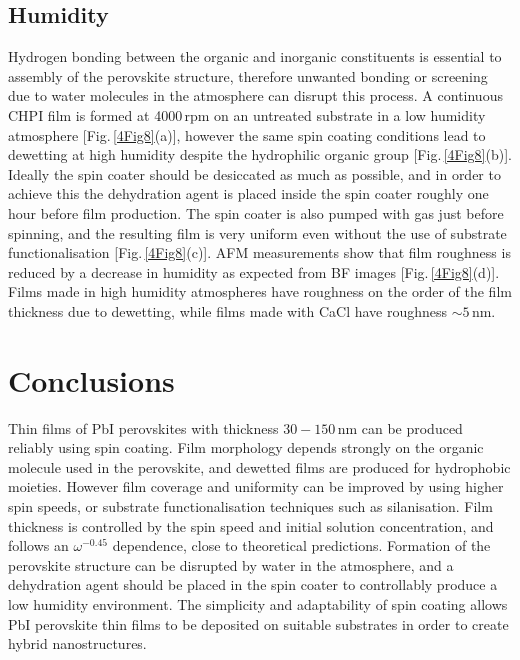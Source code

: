 \subsection{Humidity}
Hydrogen bonding between the organic and inorganic constituents is essential to assembly of the perovskite structure, therefore unwanted bonding or screening due to water molecules in the atmosphere can disrupt this process. A continuous CHPI film is formed at 4000\,rpm on an untreated substrate in a low humidity atmosphere [Fig.\,\ref{4Fig8}(a)], however the same spin coating conditions lead to dewetting at high humidity despite the hydrophilic organic group [Fig.\,\ref{4Fig8}(b)]. Ideally the spin coater should be desiccated as much as possible, and in order to achieve this the dehydration agent  is placed inside the spin coater roughly one hour before film production. The spin coater is also pumped with  gas just before spinning, and the resulting film is very uniform even without the use of substrate functionalisation [Fig.\,\ref{4Fig8}(c)]. AFM measurements show that film roughness is reduced by a decrease in humidity as expected from BF images [Fig.\,\ref{4Fig8}(d)]. Films made in high humidity atmospheres have roughness on the order of the film thickness due to dewetting, while films made with CaCl have roughness $\sim5$\,nm.


\section{Conclusions}
Thin films of PbI perovskites with thickness $30-150$\,nm can be produced reliably using spin coating. Film morphology depends strongly on the organic molecule used in the perovskite, and dewetted films are produced for hydrophobic moieties. However film coverage and uniformity can be improved by using higher spin speeds, or substrate functionalisation techniques such as silanisation. Film thickness is controlled by the spin speed and initial solution concentration, and follows an $\omega^{-0.45}$ dependence, close to theoretical predictions. Formation of the perovskite structure can be disrupted by water in the atmosphere, and a dehydration agent should be placed in the spin coater to controllably produce a low humidity environment. The simplicity and adaptability of spin coating allows PbI perovskite thin films to be deposited on suitable substrates in order to create hybrid nanostructures.